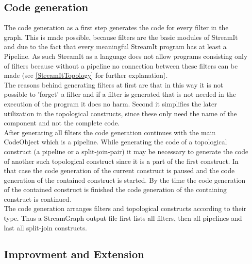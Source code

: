 \documentclass[journal]{IEEEtran}
\begin{document}
\subsection{Code generation}
\noindent The code generation as a first step generates the code for every
filter in the graph. This is made possible, because filters are the basic
modules of StreamIt and due to the fact that every meaningful StreamIt program
has at least a Pipeline. As such StreamIt as a language does not allow programs
consisting only of filters because without a pipeline no connection between
these filters can be made (see \ref{StreamItTopology} for further
explanation). \\
The reasons behind generating filters at first are that in this 
way it is not possible to 'forget' a filter and if a filter is generated that 
is not needed in the execution of the program it does no harm. Second it 
simplifies the later utilization in the topological constructs, since these 
only need the name of the component and not the complete code.\\

After generating all filters the code generation continues with the main
CodeObject which is a pipeline. While generating the code of a topological
construct (a pipeline or a split-join-pair) it may be necessary to generate the
code of another such topological construct since it is a part of the first
construct. In that case the code generation of the current construct is paused
and the code generation of the contained construct is started. By the time the
code generation of the contained construct is finished the code generation of
the containing construct is continued.\\

The code generation arranges filters and topological constructs according to
their type. Thus a StreamGraph output file first lists all filters, then all
pipelines and last all split-join constructs.\\

\subsection{Improvment and Extension}
\end{document}
